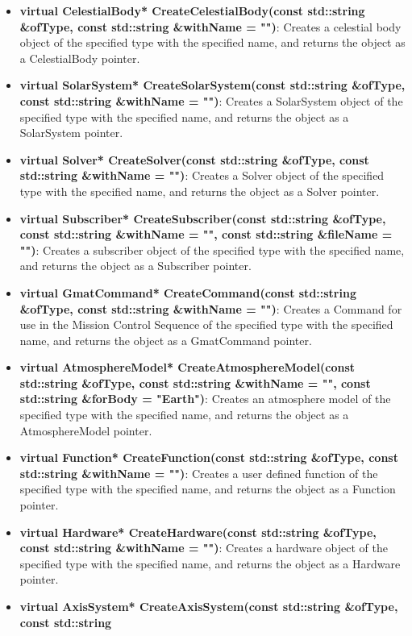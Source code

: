 \begin{itemize}
{std::string \&withName = "")}:  Creates a calculated point SpacePoint of the specified type with
the specified name, and returns the object as a CalculatedPoint pointer.
\item \textbf{virtual CelestialBody* CreateCelestialBody(const std::string \&ofType, const
std::string \&withName = "")}:  Creates a celestial body object of the specified type with the
specified name, and returns the object as a CelestialBody pointer.
\item \textbf{virtual SolarSystem* CreateSolarSystem(const std::string \&ofType, const std::string
\&withName = "")}:  Creates a SolarSystem object of the specified type with the specified name, and
returns the object as a SolarSystem pointer.
\item \textbf{virtual Solver* CreateSolver(const std::string \&ofType, const std::string \&withName
= "")}:  Creates a Solver object of the specified type with the specified name, and returns
the object as a Solver pointer.
\item \textbf{virtual Subscriber* CreateSubscriber(const std::string \&ofType, const std::string
\&withName = "", const std::string \&fileName = "")}:  Creates a subscriber object of the specified
type with the specified name, and returns the object as a Subscriber pointer.
\item \textbf{virtual GmatCommand* CreateCommand(const std::string \&ofType, const std::string
\&withName = "")}:  Creates a Command for use in the Mission Control Sequence of the specified type
with the specified name, and returns the object as a GmatCommand pointer.
\item \textbf{virtual AtmosphereModel* CreateAtmosphereModel(const std::string \&ofType, const
std::string \&withName = "", const std::string \&forBody = "Earth")}:  Creates an atmosphere model
of the specified type with the specified name, and returns the object as a AtmosphereModel pointer.
\item \textbf{virtual Function* CreateFunction(const std::string \&ofType, const std::string
\&withName = "")}:  Creates a user defined function of the specified type with the specified name,
and returns the object as a Function pointer.
\item \textbf{virtual Hardware* CreateHardware(const std::string \&ofType, const std::string
\&withName = "")}:  Creates a hardware object of the specified type with the specified name, and
returns the object as a Hardware pointer.
\item \textbf{virtual AxisSystem* CreateAxisSystem(const std::string \&ofType, const std::string
}
\end{itemize}
